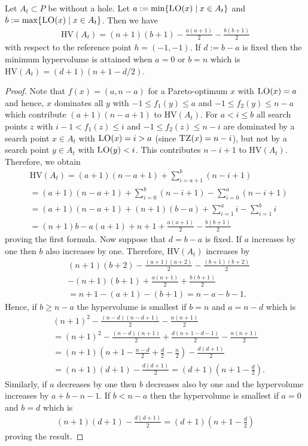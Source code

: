 \documentclass[
sigconf = false, %
review = false, %
screen = true, %
anonymous = true, %
format=acmsmall
]{acmart}
\newcommand{\hv}{\ensuremath{\mathrm{HV}}\xspace}
\newcommand{\LO}{\textsc{LO}\xspace}                      %
\newcommand{\TZ}{\textsc{TZ}\xspace}
\begin{document}
\begin{lemma}
\label{lem:hypervolume-basic-properties}
  Let $A_t \subset P$ be without a hole. Let $a:=\min\{\LO(x) \mid x \in A_t\}$ and $b:=\max\{\LO(x) \mid x \in A_t\}$. Then we have 
  \begin{align*}
    \hv(A_t) = (n+1)(b+1) - \frac{a(a+1)}{2}  - \frac{b(b+1)}{2}
  \end{align*}
  with respect to the reference point $h=(-1,-1)$. If $d:=b-a$ is fixed then the minimum hypervolume is attained when $a=0$ or $b=n$ which is $\hv(A_t) = (d+1)(n+1-d/2)$.
\end{lemma}

\begin{proof}
Note that $f(x)=(a,n-a)$ for a Pareto-optimum $x$ with $\LO(x)=a$ and hence, $x$ dominates all $y$ with $-1 \leq f_1(y) \leq a$ and $-1 \leq f_2(y) \leq n-a$ which contribute $(a+1)(n-a+1)$ to $\hv(A_t)$. For $a < i \leq b$ all search points $z$ with $i-1 < f_1(z) \leq i$ and $-1 \leq f_2(z) \leq n-i$ are dominated by a search point $x \in A_t$ with $\LO(x)=i>a$ (since $\TZ(x) = n-i$), but not by a search point $y \in A_t$ with $\LO(y)<i$. This contributes $n-i+1$ to $\hv(A_t)$. Therefore, we obtain
\begin{align*}
& \hv(A_t) = (a+1)(n-a+1) + \sum_{i=a+1}^b (n-i + 1)\\
& = (a+1)(n-a+1) + \sum_{i=0}^{b} (n-i + 1)  - \sum_{i=0}^a (n-i + 1)\\
& = (a+1)(n-a+1) + (n+1)(b-a) + \sum_{i=1}^{a} i  - \sum_{i=1}^{b} i\\
& = (n+1)b-a(a+1)+n + 1 + \frac{a(a+1)}{2}  - \frac{b(b+1)}{2}
\end{align*}
proving the first formula. Now suppose that $d=b-a$ is fixed. If $a$ increases by one then $b$ also increases by one. Therefore, $\hv(A_t)$ increases by
\begin{align*}
&(n+1)(b+2) - \frac{(a+1)(a+2)}{2}  - \frac{(b+1)(b+2)}{2} \\
&- (n+1)(b+1) + \frac{a(a+1)}{2}  + \frac{b(b+1)}{2} \\ 
&= n+1-(a+1)-(b+1) = n-a-b-1.
\end{align*}
Hence, if $b \geq n-a$ the hypervolume is smallest if $b=n$ and $a=n-d$ which is 
\begin{align*}
& (n+1)^2 - \frac{(n-d)(n-d+1)}{2} - \frac{n(n+1)}{2} \\ 
&= (n+1)^2 - \frac{(n-d)(n+1)}{2} + \frac{d(n+1-d-1)}{2} - \frac{n(n+1)}{2} \\ 
&= (n+1)\left(n+1-\frac{n-d}{2}+\frac{d}{2}-\frac{n}{2}\right) - \frac{d(d+1)}{2} \\ 
&= (n+1)(d+1)-\frac{d(d+1)}{2} = (d+1)\left(n+1-\frac{d}{2}\right).
\end{align*}
Similarly, if $a$ decreases by one then $b$ decreases also by one and the hypervolume increases by $a+b-n-1$. If $b < n-a$ then the hypervolume is smallest if $a=0$ and $b=d$ which is
\begin{align*}
(n+1)(d+1)-\frac{d(d+1)}{2} = (d+1)\left(n+1-\frac{d}{2}\right)
\end{align*}
proving the result.
\end{proof}
\end{document}
